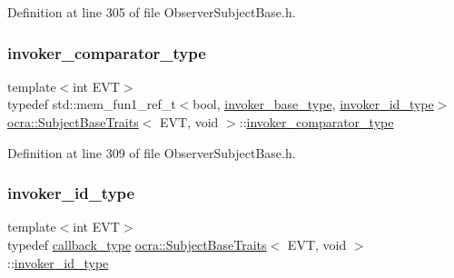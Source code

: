 Definition at line 305 of file Observer\+Subject\+Base.\+h.

\hypertarget{structocra_1_1SubjectBaseTraits_3_01EVT_00_01void_01_4_a1103b087174cb0f6e007f554c214c4d4}{}\label{structocra_1_1SubjectBaseTraits_3_01EVT_00_01void_01_4_a1103b087174cb0f6e007f554c214c4d4} 
\subsubsection{\texorpdfstring{invoker\+\_\+comparator\+\_\+type}{invoker\_comparator\_type}}
{\footnotesize\ttfamily template$<$int E\+VT$>$ \\
typedef std\+::mem\+\_\+fun1\+\_\+ref\+\_\+t$<$bool, \hyperlink{structocra_1_1SubjectBaseTraitsBase_a439671662c8f8f3e80e6675f008dec3f}{invoker\+\_\+base\+\_\+type}, \hyperlink{structocra_1_1SubjectBaseTraits_3_01EVT_00_01void_01_4_a35ce9f06a9f2a9e766ad2fb892283d08}{invoker\+\_\+id\+\_\+type}$>$ \hyperlink{structocra_1_1SubjectBaseTraits}{ocra\+::\+Subject\+Base\+Traits}$<$ E\+VT, void $>$\+::\hyperlink{structocra_1_1SubjectBaseTraits_3_01EVT_00_01void_01_4_a1103b087174cb0f6e007f554c214c4d4}{invoker\+\_\+comparator\+\_\+type}}



Definition at line 309 of file Observer\+Subject\+Base.\+h.

\hypertarget{structocra_1_1SubjectBaseTraits_3_01EVT_00_01void_01_4_a35ce9f06a9f2a9e766ad2fb892283d08}{}\label{structocra_1_1SubjectBaseTraits_3_01EVT_00_01void_01_4_a35ce9f06a9f2a9e766ad2fb892283d08} 
\subsubsection{\texorpdfstring{invoker\+\_\+id\+\_\+type}{invoker\_id\_type}}
{\footnotesize\ttfamily template$<$int E\+VT$>$ \\
typedef \hyperlink{structocra_1_1SubjectBaseTraits_3_01EVT_00_01void_01_4_a805e01034816edb44ee4269aba6c5beb}{callback\+\_\+type} \hyperlink{structocra_1_1SubjectBaseTraits}{ocra\+::\+Subject\+Base\+Traits}$<$ E\+VT, void $>$\+::\hyperlink{structocra_1_1SubjectBaseTraits_3_01EVT_00_01void_01_4_a35ce9f06a9f2a9e766ad2fb892283d08}{invoker\+\_\+id\+\_\+type}}



